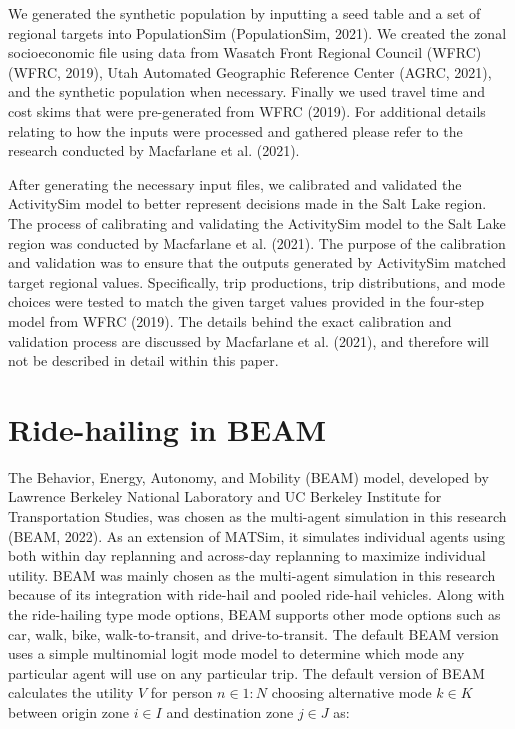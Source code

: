 \documentclass[fancy, masters]{byuthesis}
\begin{document}
We generated the synthetic population by inputting a seed table and a set of regional targets into PopulationSim (PopulationSim, 2021). We created the zonal socioeconomic file using data from Wasatch Front Regional Council (WFRC) (WFRC, 2019), Utah Automated Geographic Reference Center (AGRC, 2021), and the synthetic population when necessary. Finally we used travel time and cost skims that were pre-generated from WFRC (2019). For additional details relating to how the inputs were processed and gathered please refer to the research conducted by Macfarlane et al. (2021).

After generating the necessary input files, we calibrated and validated the ActivitySim model to better represent decisions made in the Salt Lake region. The process of calibrating and validating the ActivitySim model to the Salt Lake region was conducted by Macfarlane et al. (2021). The purpose of the calibration and validation was to ensure that the outputs generated by ActivitySim matched target regional values. Specifically, trip productions, trip distributions, and mode choices were tested to match the given target values provided in the four-step model from WFRC (2019). The details behind the exact calibration and validation process are discussed by Macfarlane et al. (2021), and therefore will not be described in detail within this paper.

\hypertarget{novel-beam}{%
\section{Ride-hailing in BEAM}\label{novel-beam}}

The Behavior, Energy, Autonomy, and Mobility (BEAM) model, developed by Lawrence Berkeley National Laboratory and UC Berkeley Institute for Transportation Studies, was chosen as the multi-agent simulation in this research (BEAM, 2022). As an extension of MATSim, it simulates individual agents using both within day replanning and across-day replanning to maximize individual utility. BEAM was mainly chosen as the multi-agent simulation in this research because of its integration with ride-hail and pooled ride-hail vehicles. Along with the ride-hailing type mode options, BEAM supports other mode options such as car, walk, bike, walk-to-transit, and drive-to-transit. The default BEAM version uses a simple multinomial logit mode model to determine which mode any particular agent will use on any particular trip. The default version of BEAM calculates the utility \(V\) for person \(n \in {1:N}\) choosing alternative mode \(k \in K\) between origin zone \(i \in I\) and destination zone \(j \in J\) as:
\end{document}
